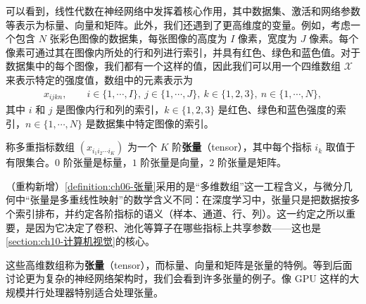\documentclass[../../main.tex]{subfiles}
\begin{document}
可以看到，线性代数在神经网络中发挥着核心作用，其中数据集、激活和网络参数等表示为标量、向量和矩阵。此外，我们还遇到了更高维度的变量。例如，考虑一个包含 $N$ 张彩色图像的数据集，每张图像的高度为 $I$ 像素，宽度为 $J$ 像素。每个像素可通过其在图像内所处的行和列进行索引，并具有红色、绿色和蓝色值。对于数据集中的每个图像，我们都有一个这样的值，因此我们可以用一个四维数组 $\mathcal{X}$ 来表示特定的强度值，数组中的元素表示为
\begin{align}
x_{ijkn},\qquad i\in\{1,\cdots,I\},\ j\in\{1,\cdots,J\},\ k\in\{1,2,3\},\ n\in\{1,\cdots,N\},
\label{align:ch06-张量元素}
\end{align}
其中 $i$ 和 $j$ 是图像内行和列的索引，$k\in\{1,2,3\}$ 是红色、绿色和蓝色强度的索引，$n\in\{1,\cdots,N\}$ 是数据集中特定图像的索引。

\begin{definition}[张量]\label{definition:ch06-张量}
称多重指标数组 $(x_{i_1i_2\cdots i_K})$ 为一个 $K$ 阶\textbf{张量}（tensor），其中每个指标 $i_k$ 取值于有限集合。$0$ 阶张量是标量，$1$ 阶张量是向量，$2$ 阶张量是矩阵。
\end{definition}

\begin{remark}（重构新增）\cref{definition:ch06-张量}采用的是“多维数组”这一工程含义，与微分几何中“张量是多重线性映射”的数学含义不同：在深度学习中，张量只是把数据按多个索引排布，并约定各阶指标的语义（样本、通道、行、列）。这一约定之所以重要，是因为它决定了卷积、池化等算子在哪些指标上共享参数——这也是\cref{section:ch10-计算机视觉}的核心。
\end{remark}

这些高维数组称为\textbf{张量}（tensor），而标量、向量和矩阵是张量的特例。等到后面讨论更为复杂的神经网络架构时，我们会看到许多张量的例子。像 GPU 这样的大规模并行处理器特别适合处理张量。
\end{document}
